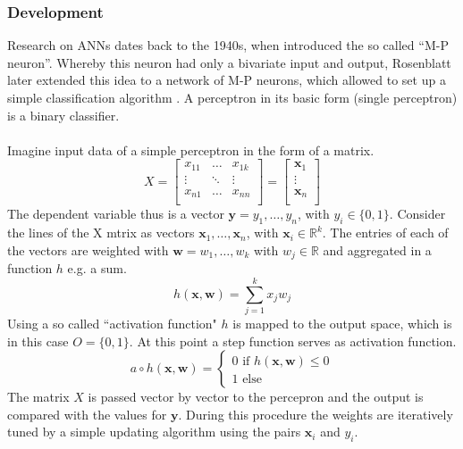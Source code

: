 \documentclass[11pt,a4paper]{article}
\begin{document}
\subsubsection{Development} \label{ANN_development}
Research on ANNs dates back to the 1940s, when \cite{McCulloch1943} introduced the so called “M-P neuron”. Whereby this neuron had only a bivariate input and output, Rosenblatt later extended this idea to a network of M-P neurons, which allowed to set up a simple classification algorithm \cite{Rb1958}. A perceptron in its basic form (single perceptron) is a binary classifier. \\
\\
Imagine input data of a simple perceptron in the form of a matrix. 
$$X= \left[
\begin{array}{rrr}                                
x_{11} & \dots & x_{1k} \\                                               
\vdots & \ddots & \vdots \\                                               
x_{n1} & \dots & x_{nn} \\                                             
\end{array}
\right] = \left[
\begin{array}{r}                                
\textbf{x}_{1} \\                                               
\vdots \\                                               
\textbf{x}_{n} \\                                             
\end{array}
\right]
$$ 
The dependent variable thus is a vector $\textbf{y}=y_1,…,y_n$, with $y_i\in \{0,1\}$. Consider the lines of the X mtrix as vectors $\textbf{x}_1,…,\textbf{x}_n$, with $\textbf{x}_i\in\mathbb{R}^k$. The entries of each of the vectors are weighted with $\textbf{w}=w_1,\dots,w_k$ with $w_j \in \mathbb{R}$ and aggregated in a function $h$ e.g. a sum.
$$h(\textbf{x},\textbf{w})=\sum_{j=1}^kx_jw_j$$
Using a so called ``activation function" $h$ is mapped to the output space, which is in this case $O=\{0,1\}$. At this point a step function serves as activation function.
$$a \circ h(\textbf{x},\textbf{w}) = \begin{cases} 0 \text{ if } h(\textbf{x},\textbf{w}) \leq 0 \\ 1 \text{ else}\end{cases}$$
The matrix $X$ is passed vector by vector to the percepron and the output is compared with the values for $\textbf{y}$. During this procedure the weights are iteratively tuned by a simple updating algorithm using the pairs $\textbf{x}_i$ and $y_i.$
\end{document}
